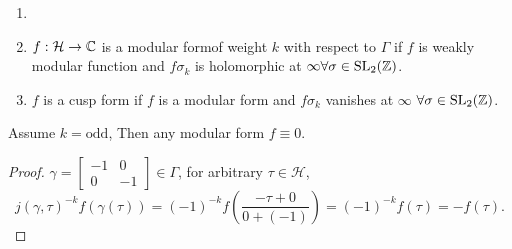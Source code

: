 \begin{definition}
  \begin{enumerate}
    \item []
    \item $f:\mathcal{H}\to \mathbb{C}$ is a modular formof weight $k$ with respect to $\Gamma$ if $f$ is weakly modular function and $f\sigma_k$ is holomorphic at $\infty \forall \sigma \in \operatorname{SL}_2(\mathbb{Z})$.
    \item $f$ is a cusp form if $f$ is a modular form and $f\sigma_k$ vanishes at $\infty$ $ \forall \sigma \in \operatorname{SL}_2(\mathbb{Z})$.
  \end{enumerate}
\end{definition}
\begin{proposition}
  Assume $k=\text{odd}$, Then any modular form $f\equiv 0$.
\end{proposition}
\begin{proof}
  $\gamma =\begin{bmatrix} -1&0\\0&-1 \end{bmatrix} \in \Gamma$, for arbitrary $\tau \in \mathcal{H}$,
  \[
    j(\gamma,\tau)^{-k}f(\gamma(\tau))=(-1)^{-k}f( \frac{-\tau+0}{0+(-1)})=(-1)^{-k}f(\tau)=-f(\tau).
  \] 
\end{proof}
